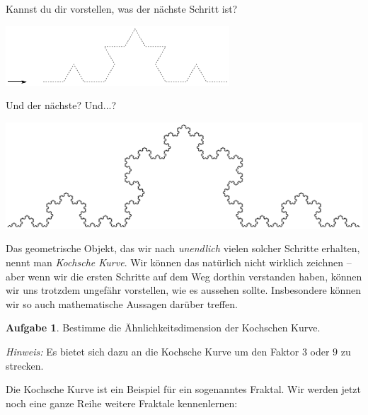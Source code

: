 \documentclass[a4paper,ngerman,12pt]{scrartcl}
\theoremstyle{definition}
\newtheorem{aufg}{Aufgabe}
\theoremstyle{plain}
\theoremstyle{remark}
\begin{document}
Kannst du dir vorstellen, was der nächste Schritt ist?

\begin{center}
	\includegraphics[width=.7\textwidth]{Bilder/Schneeflocke-Konstruktion2.pdf}
\end{center}

Und der nächste? Und...?

\begin{center}
	\includegraphics[width=.5\textwidth]{Bilder/Schneeflocke-Konstruktion3.pdf}
\end{center}

Das geometrische Objekt, das wir nach \emph{unendlich} vielen solcher Schritte erhalten, nennt man \emph{Kochsche Kurve}. Wir können das natürlich nicht wirklich zeichnen -- aber wenn wir die ersten Schritte auf dem Weg dorthin verstanden haben, können wir uns trotzdem ungefähr vorstellen, wie es aussehen sollte. Insbesondere können wir so auch mathematische Aussagen darüber treffen.

\begin{aufg}
	Bestimme die Ähnlichkeitsdimension der Kochschen Kurve. 
	
	\textit{Hinweis:} Es bietet sich dazu an die Kochsche Kurve um den Faktor $3$ oder $9$ zu strecken.
\end{aufg}

Die Kochsche Kurve ist ein Beispiel für ein sogenanntes Fraktal. Wir werden jetzt noch eine ganze Reihe weitere Fraktale kennenlernen:
\end{document}
